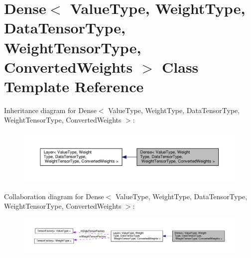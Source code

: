 \hypertarget{classDense}{}\section{Dense$<$ Value\+Type, Weight\+Type, Data\+Tensor\+Type, Weight\+Tensor\+Type, Converted\+Weights $>$ Class Template Reference}
\label{classDense}


Inheritance diagram for Dense$<$ Value\+Type, Weight\+Type, Data\+Tensor\+Type, Weight\+Tensor\+Type, Converted\+Weights $>$\+:
\nopagebreak
\begin{figure}[H]
\begin{center}
\leavevmode
\includegraphics[width=350pt]{classDense__inherit__graph}
\end{center}
\end{figure}


Collaboration diagram for Dense$<$ Value\+Type, Weight\+Type, Data\+Tensor\+Type, Weight\+Tensor\+Type, Converted\+Weights $>$\+:
\nopagebreak
\begin{figure}[H]
\begin{center}
\leavevmode
\includegraphics[width=350pt]{classDense__coll__graph}
\end{center}
\end{figure}
